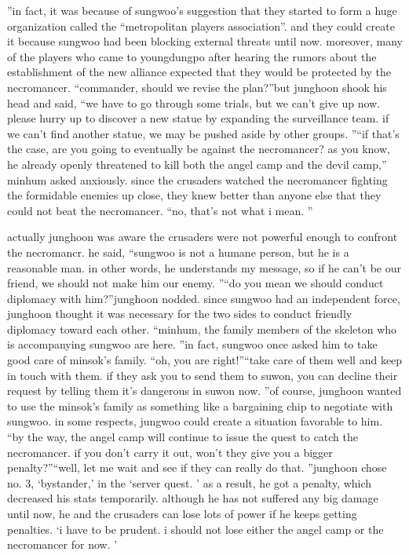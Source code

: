 ”in fact, it was because of sungwoo’s suggestion that they started to form a huge organization called the “metropolitan players association”.
 and they could create it because sungwoo had been blocking external threats until now.
moreover, many of the players who came to youngdungpo after hearing the rumors about the establishment of the new alliance expected that they would be protected by the necromancer.
“commander, should we revise the plan?”but junghoon shook his head and said, “we have to go through some trials, but we can’t give up now.
 please hurry up to discover a new statue by expanding the surveillance team.
 if we can’t find another statue, we may be pushed aside by other groups.
”“if that’s the case, are you going to eventually be against the necromancer? as you know, he already openly threatened to kill both the angel camp and the devil camp,” minhum asked anxiously.
since the crusaders watched the necromancer fighting the formidable enemies up close, they knew better than anyone else that they could not beat the necromancer.
“no, that’s not what i mean.
”

actually junghoon was aware the crusaders were not powerful enough to confront the necromancr.
he said, “sungwoo is not a humane person, but he is a reasonable man.
 in other words, he understands my message, so if he can’t be our friend, we should not make him our enemy.
”“do you mean we should conduct diplomacy with him?”junghoon nodded.
 since sungwoo had an independent force, junghoon thought it was necessary for the two sides to conduct friendly diplomacy toward each other.
“minhum, the family members of the skeleton who is accompanying sungwoo are here.
”in fact, sungwoo once asked him to take good care of minsok’s family.
“oh, you are right!”“take care of them well and keep in touch with them.
 if they ask you to send them to suwon, you can decline their request by telling them it’s dangerous in suwon now.
”of course, junghoon wanted to use the minsok’s family as something like a bargaining chip to negotiate with sungwoo.
 in some respects, jungwoo could create a situation favorable to him.
“by the way, the angel camp will continue to issue the quest to catch the necromancer.
 if you don’t carry it out, won’t they give you a bigger penalty?”“well, let me wait and see if they can really do that.
”junghoon chose no.
 3, ‘bystander,’ in the ‘server quest.
’ as a result, he got a penalty, which decreased his stats temporarily.
although he has not suffered any big damage until now, he and the crusaders can lose lots of power if he keeps getting penalties.
‘i have to be prudent.
 i should not lose either the angel camp or the necromancer for now.
’

 
